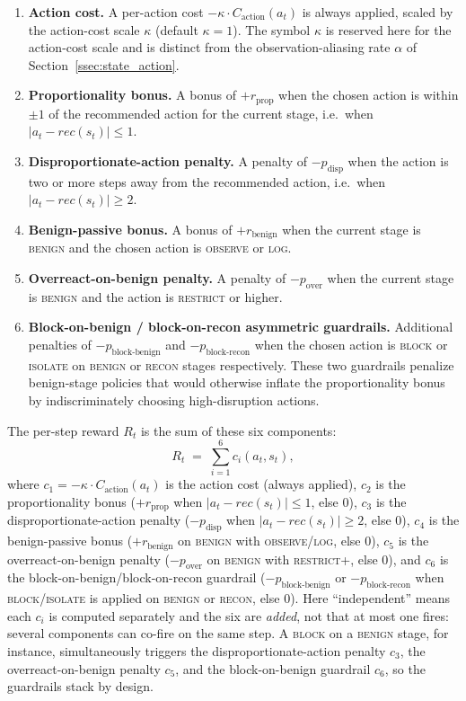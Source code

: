 \begin{enumerate}
  \item \textbf{Action cost.} A per-action cost $-\kappa \cdot C_{\mathrm{action}}(a_t)$ is always applied, scaled by the action-cost scale $\kappa$ (default $\kappa = 1$). The symbol $\kappa$ is reserved here for the action-cost scale and is distinct from the observation-aliasing rate $\alpha$ of Section~\ref{ssec:state_action}.
  \item \textbf{Proportionality bonus.} A bonus of $+r_{\mathrm{prop}}$ when the chosen action is within $\pm 1$ of the recommended action for the current stage, i.e.\ when $|a_t - \mathit{rec}(s_t)| \leq 1$.
  \item \textbf{Disproportionate-action penalty.} A penalty of $-p_{\mathrm{disp}}$ when the action is two or more steps away from the recommended action, i.e.\ when $|a_t - \mathit{rec}(s_t)| \geq 2$.
  \item \textbf{Benign-passive bonus.} A bonus of $+r_{\mathrm{benign}}$ when the current stage is \textsc{benign} and the chosen action is \textsc{observe} or \textsc{log}.
  \item \textbf{Overreact-on-benign penalty.} A penalty of $-p_{\mathrm{over}}$ when the current stage is \textsc{benign} and the action is \textsc{restrict} or higher.
  \item \textbf{Block-on-benign / block-on-recon asymmetric guardrails.} Additional penalties of $-p_{\mathrm{block\text{-}benign}}$ and $-p_{\mathrm{block\text{-}recon}}$ when the chosen action is \textsc{block} or \textsc{isolate} on \textsc{benign} or \textsc{recon} stages respectively. These two guardrails penalize benign-stage policies that would otherwise inflate the proportionality bonus by indiscriminately choosing high-disruption actions.
\end{enumerate}
The per-step reward $R_t$ is the sum of these six components:
\begin{equation}\label{eq:reward}
R_t \;=\; \sum_{i=1}^{6} c_i(a_t, s_t),
\end{equation}
where $c_1 = -\kappa \cdot C_{\mathrm{action}}(a_t)$ is the action cost (always applied), $c_2$ is the proportionality bonus ($+r_{\mathrm{prop}}$ when $|a_t - \mathit{rec}(s_t)| \leq 1$, else $0$), $c_3$ is the disproportionate-action penalty ($-p_{\mathrm{disp}}$ when $|a_t - \mathit{rec}(s_t)| \geq 2$, else $0$), $c_4$ is the benign-passive bonus ($+r_{\mathrm{benign}}$ on \textsc{benign} with \textsc{observe}/\textsc{log}, else $0$), $c_5$ is the overreact-on-benign penalty ($-p_{\mathrm{over}}$ on \textsc{benign} with \textsc{restrict}+, else $0$), and $c_6$ is the block-on-benign/block-on-recon guardrail ($-p_{\mathrm{block\text{-}benign}}$ or $-p_{\mathrm{block\text{-}recon}}$ when \textsc{block}/\textsc{isolate} is applied on \textsc{benign} or \textsc{recon}, else $0$). Here ``independent'' means each $c_i$ is computed separately and the six are \emph{added}, not that at most one fires: several components can co-fire on the same step. A \textsc{block} on a \textsc{benign} stage, for instance, simultaneously triggers the disproportionate-action penalty $c_3$, the overreact-on-benign penalty $c_5$, and the block-on-benign guardrail $c_6$, so the guardrails stack by design.
